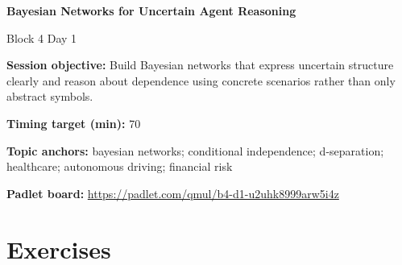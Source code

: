 \documentclass[11pt]{article}
\begin{document}
\begin{center}\LARGE\bfseries Bayesian Networks for Uncertain Agent Reasoning\end{center}

\begin{center}\large Block 4 Day 1\end{center}

\begin{tcolorbox}[colback=MidnightBlue!4,colframe=MidnightBlue,title={Session Overview},fonttitle=\bfseries,breakable]
\textbf{Session objective:} Build Bayesian networks that express uncertain structure clearly and reason about dependence using concrete scenarios rather than only abstract symbols.

\textbf{Timing target (min):} 70

\textbf{Topic anchors:} bayesian networks; conditional independence; d-separation; healthcare; autonomous driving; financial risk

\textbf{Padlet board:} \url{https://padlet.com/qmul/b4-d1-u2uhk8999arw5i4z}
\end{tcolorbox}

\section*{Exercises}
\end{document}
